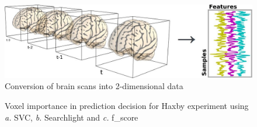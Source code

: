 \documentclass{frontiersSCNS} %
\begin{document}
\begin{figure}[h]
    \includegraphics[width=.5\linewidth]{img/niimgs.jpg}
    \caption{Conversion of brain scans into 2-dimensional data}
    \label{fig:niimg}
\end{figure}

\begin{figure}[h]
  \begin{center}
  \end{center}
\caption{Voxel importance in prediction decision for Haxby experiment
using \textit{a.} SVC, \textit{b.} Searchlight and \textit{c.}
f\_score}
\label{fig:haxby}
\end{figure}
\end{document}

